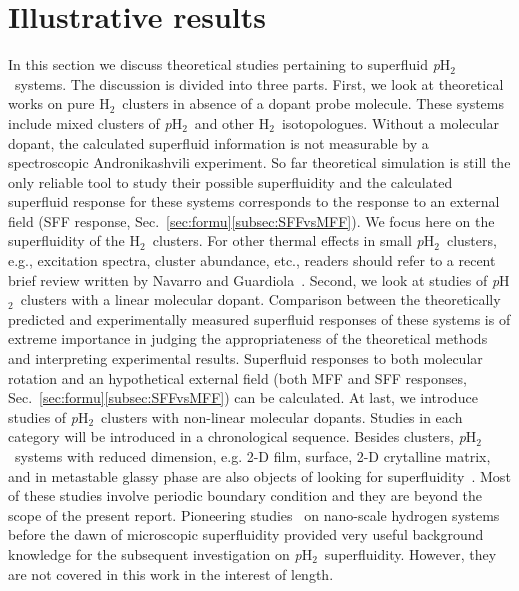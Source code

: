 \documentclass[12pt]{iopart}
\newcommand{\hydrogen}{H$_2$}
\newcommand{\phtwo}{{\em p}H$_2$}
\begin{document}
\section{Illustrative results} \label{sec:results}

In this section we discuss theoretical studies pertaining to superfluid \phtwo~systems. 
The discussion is divided into three parts. First, we look at theoretical works on pure \hydrogen~clusters in absence of a dopant probe molecule.
These systems include mixed clusters of \phtwo~and other \hydrogen~isotopologues. 
Without a molecular dopant, the calculated superfluid information is not measurable by a spectroscopic Andronikashvili experiment. 
So far theoretical simulation is still the only reliable tool to study their possible superfluidity and the calculated superfluid response for these systems corresponds to the response to an external field (SFF response, Sec.~\ref{sec:formu}\ref{subsec:SFFvsMFF}). 
We focus here  on the superfluidity of the \hydrogen~clusters. 
For other thermal effects in small \phtwo~clusters, e.g., excitation spectra, cluster abundance, etc., readers should refer to a recent brief review written by Navarro and Guardiola~\cite{navaro_ph2_review}. 
Second, we look at studies of \phtwo~clusters with a linear molecular dopant. 
Comparison between the theoretically predicted and experimentally measured superfluid responses of these systems is of extreme importance in judging the appropriateness of the theoretical methods and interpreting experimental results. 
Superfluid responses to both molecular rotation and an hypothetical external field (both MFF and SFF responses, Sec.~\ref{sec:formu}\ref{subsec:SFFvsMFF}) can be calculated. 
At last, we introduce studies of \phtwo~clusters with non-linear molecular dopants. 
Studies in each category will be introduced in a chronological sequence. 
Besides clusters, \phtwo~systems with reduced dimension, e.g. 2-D film, surface, 2-D crytalline matrix, and in metastable glassy phase are also objects of looking for superfluidity~\cite{wagner_h2_surface,ceperley_pimc_he_h2,wagner_melting_surface,ceperley_condition,gordillo_superfluid_h2film,boninsegni_ph2_layer_li,boninsegni_ph2_2d_matrix,boninsegni_ph2_c60,osychenko_h2_glassy}. 
Most of these studies involve periodic boundary condition and they are beyond the scope of the present report.
Pioneering studies~\cite{whaley_h2_clusters_structure,scharf_pimc_ph2_clusters,scharf_ph2_od2_isotope,mcmahon_quantum_liquid,whaley_vmc_dmc_h2,buch_pd2_od2_mixed,cheng_quantum_liquid} on nano-scale hydrogen systems before the dawn of microscopic superfluidity provided very useful background knowledge for the subsequent investigation on \phtwo~superfluidity. However, they are not covered in this work in the interest of length.
\end{document}
